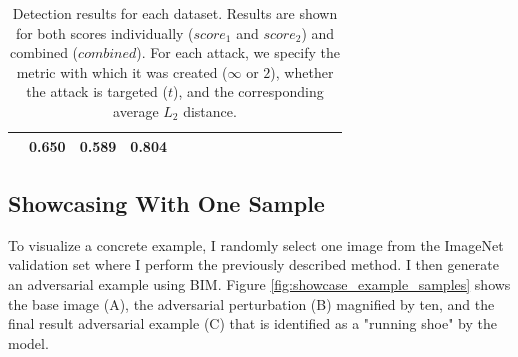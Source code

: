 \begin{table}[tph]
\begin{adjustbox}{angle=90}
{\begin{tabular}{c|c|cc|ccc|ccc|ccc|ccc}
                                                                        & 0.650
                                                                        & 0.589
                                                                        &
                \textbf{0.804}
                \\
                \bottomrule
            \end{tabular}
        }
    \end{adjustbox}
    \caption{Detection results for each dataset. Results are shown for both
        scores individually ($score_1$ and $score_2$) and combined ($combined$).
        For each attack, we specify the metric with which it was created
        ($\infty$ or $2$), whether the attack is targeted ($t$), and the
        corresponding average $L_2$ distance. \label{tab:detection_results}}
\end{table}

\pagebreak
\subsection{Showcasing With One Sample}
To visualize a concrete example, I randomly select one image from the ImageNet
validation set where I perform the previously described method. I then generate
an adversarial example using BIM. Figure \ref{fig:showcase_example_samples}
shows the base image (A), the adversarial perturbation (B) magnified by ten, and
the final result adversarial example (C) that is identified as a "running shoe"
by the model.

